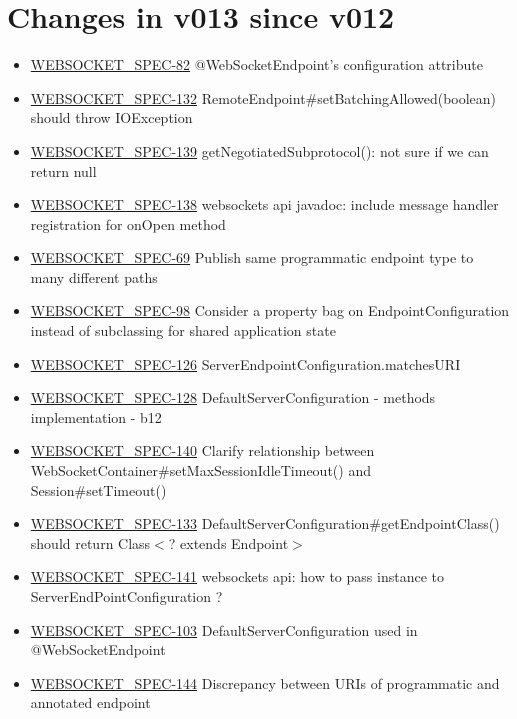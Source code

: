 \section*{Changes in v013 since v012}

\begin{itemize}
\item \href {http://java.net/jira/browse/WEBSOCKET_SPEC-82}{WEBSOCKET\_SPEC-82} @WebSocketEndpoint's configuration attribute
\item \href {http://java.net/jira/browse/WEBSOCKET_SPEC-132}{WEBSOCKET\_SPEC-132} RemoteEndpoint\#setBatchingAllowed(boolean) should throw IOException
\item \href {http://java.net/jira/browse/WEBSOCKET_SPEC-139}{WEBSOCKET\_SPEC-139} getNegotiatedSubprotocol(): not sure if we can return null
\item \href {http://java.net/jira/browse/WEBSOCKET_SPEC-138}{WEBSOCKET\_SPEC-138} websockets api javadoc: include message handler registration for onOpen method
\item \href {http://java.net/jira/browse/WEBSOCKET_SPEC-69}{WEBSOCKET\_SPEC-69} Publish same programmatic endpoint type to many different paths
\item \href {http://java.net/jira/browse/WEBSOCKET_SPEC-98}{WEBSOCKET\_SPEC-98} Consider a property bag on EndpointConfiguration instead of subclassing for shared application state
\item \href {http://java.net/jira/browse/WEBSOCKET_SPEC-126}{WEBSOCKET\_SPEC-126} ServerEndpointConfiguration.matchesURI
\item \href {http://java.net/jira/browse/WEBSOCKET_SPEC-128}{WEBSOCKET\_SPEC-128} DefaultServerConfiguration - methods implementation - b12
\item \href {http://java.net/jira/browse/WEBSOCKET_SPEC-140}{WEBSOCKET\_SPEC-140} Clarify relationship between WebSocketContainer\#setMaxSessionIdleTimeout() and Session\#setTimeout()
\item \href {http://java.net/jira/browse/WEBSOCKET_SPEC-133}{WEBSOCKET\_SPEC-133} DefaultServerConfiguration\#getEndpointClass() should return Class$<$? extends Endpoint$>$
\item \href {http://java.net/jira/browse/WEBSOCKET_SPEC-141}{WEBSOCKET\_SPEC-141} websockets api: how to pass instance to ServerEndPointConfiguration ?
\item \href {http://java.net/jira/browse/WEBSOCKET_SPEC-103}{WEBSOCKET\_SPEC-103} DefaultServerConfiguration used in @WebSocketEndpoint
\item \href {http://java.net/jira/browse/WEBSOCKET_SPEC-144}{WEBSOCKET\_SPEC-144} Discrepancy between URIs of programmatic and annotated endpoint 

\end{itemize}
